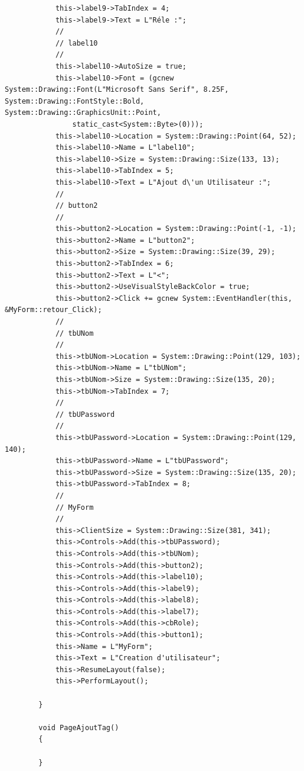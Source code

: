 \documentclass[main.tex]{subfiles}
\begin{document}
\begin{lstlisting}
			this->label9->TabIndex = 4;
			this->label9->Text = L"Réle :";
			// 
			// label10
			// 
			this->label10->AutoSize = true;
			this->label10->Font = (gcnew System::Drawing::Font(L"Microsoft Sans Serif", 8.25F, System::Drawing::FontStyle::Bold, System::Drawing::GraphicsUnit::Point,
				static_cast<System::Byte>(0)));
			this->label10->Location = System::Drawing::Point(64, 52);
			this->label10->Name = L"label10";
			this->label10->Size = System::Drawing::Size(133, 13);
			this->label10->TabIndex = 5;
			this->label10->Text = L"Ajout d\'un Utilisateur :";
			// 
			// button2
			// 
			this->button2->Location = System::Drawing::Point(-1, -1);
			this->button2->Name = L"button2";
			this->button2->Size = System::Drawing::Size(39, 29);
			this->button2->TabIndex = 6;
			this->button2->Text = L"<";
			this->button2->UseVisualStyleBackColor = true;
			this->button2->Click += gcnew System::EventHandler(this, &MyForm::retour_Click);
			// 
			// tbUNom
			// 
			this->tbUNom->Location = System::Drawing::Point(129, 103);
			this->tbUNom->Name = L"tbUNom";
			this->tbUNom->Size = System::Drawing::Size(135, 20);
			this->tbUNom->TabIndex = 7;
			// 
			// tbUPassword
			// 
			this->tbUPassword->Location = System::Drawing::Point(129, 140);
			this->tbUPassword->Name = L"tbUPassword";
			this->tbUPassword->Size = System::Drawing::Size(135, 20);
			this->tbUPassword->TabIndex = 8;
			// 
			// MyForm
			// 
			this->ClientSize = System::Drawing::Size(381, 341);
			this->Controls->Add(this->tbUPassword);
			this->Controls->Add(this->tbUNom);
			this->Controls->Add(this->button2);
			this->Controls->Add(this->label10);
			this->Controls->Add(this->label9);
			this->Controls->Add(this->label8);
			this->Controls->Add(this->label7);
			this->Controls->Add(this->cbRole);
			this->Controls->Add(this->button1);
			this->Name = L"MyForm";
			this->Text = L"Creation d'utilisateur";
			this->ResumeLayout(false);
			this->PerformLayout();

		}

		void PageAjoutTag()
		{

		}


\end{lstlisting}
\end{document}
